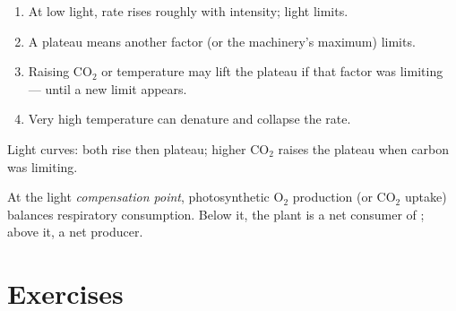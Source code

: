 \begin{method}\label{met:g10:photosynthesis:curves}
\begin{enumerate}
  \item At low light, rate rises roughly with intensity; light limits.
  \item A plateau means another factor (or the machinery's maximum)
        limits.
  \item Raising $\mathrm{CO_2}$ or temperature may lift the plateau if
        that factor was limiting --- until a new limit appears.
  \item Very high temperature can denature  and collapse the rate.
\end{enumerate}
\end{method}

\begin{omfigure}

{\small Light curves: both rise then plateau; higher $\mathrm{CO_2}$
raises the plateau when carbon was limiting.}
\end{omfigure}

\begin{proposition}\label{prop:g10:photosynthesis:compensation}
At the light \emph{compensation point},
photosynthetic $\mathrm{O_2}$ production (or $\mathrm{CO_2}$ uptake)
balances respiratory consumption. Below it, the plant is a net consumer
of ; above it, a net producer.
\end{proposition}
\admitted

\section{Exercises}

